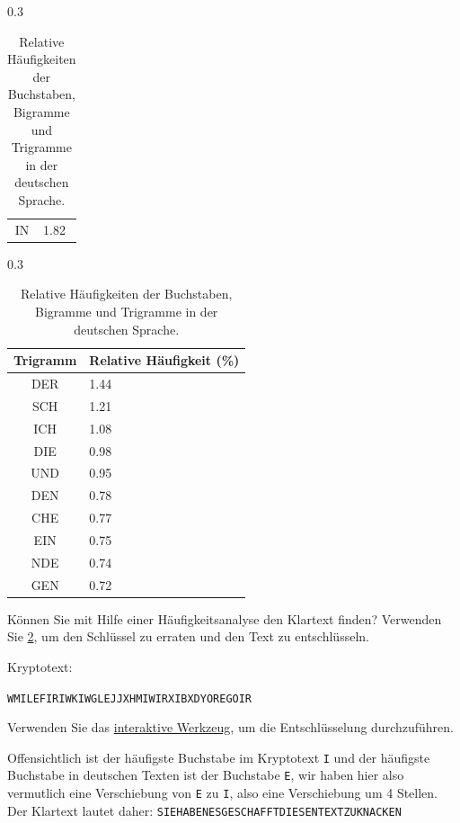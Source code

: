 \begin{table}[H]
\begin{subtable}[t]{0.3\textwidth}
\begin{tabular}{c|p{1.9cm}}
			IN               & 1.82                     \\
		\end{tabular}
		\caption{Bigrammhäufigkeit}
	\end{subtable}
	\hspace{0.5cm}
	\begin{subtable}[t]{0.3\textwidth}
		\centering
		\begin{tabular}{c|p{1.9cm}}
			\textbf{Trigramm} & Relative Häufigkeit (\%) \\ \midrule
			DER               & 1.44                     \\ \midrule
			SCH               & 1.21                     \\ \midrule
			ICH               & 1.08                     \\ \midrule
			DIE               & 0.98                     \\ \midrule
			UND               & 0.95                     \\ \midrule
			DEN               & 0.78                     \\ \midrule
			CHE               & 0.77                     \\ \midrule
			EIN               & 0.75                     \\ \midrule
			NDE               & 0.74                     \\ \midrule
			GEN               & 0.72                     \\
		\end{tabular}
		\caption{Trigrammhäufigkeit}
	\end{subtable}
	\caption{Relative Häufigkeiten der Buchstaben, Bigramme und Trigramme in der deutschen Sprache.}
	\label{tab:alle-haeufigkeiten}
\end{table}

\begin{myexercise}\label{ex:caesar}
	Können Sie mit Hilfe einer Häufigkeitsanalyse den Klartext finden? Verwenden Sie \cref{tab:alle-haeufigkeiten}, um den Schlüssel zu erraten und den Text zu entschlüsseln.

	Kryptotext:

	\texttt{WMILEFIRIWKIWGLEJJXHMIWIRXIBXDYOREGOIR}

	Verwenden Sie das \href{https://www.101computing.net/cipher-wheel.html}{interaktive Werkzeug}, um die Entschlüsselung durchzuführen.

	\begin{myanswer}
		Offensichtlich ist der häufigste Buchstabe im Kryptotext \texttt{I} und der häufigste Buchstabe in deutschen Texten ist der Buchstabe \texttt{E}, wir haben hier also vermutlich eine Verschiebung von \texttt{E} zu \texttt{I}, also eine Verschiebung um 4 Stellen. Der Klartext lautet daher: \texttt{SIEHABENESGESCHAFFTDIESENTEXTZUKNACKEN}
	\end{myanswer}
\end{myexercise}

